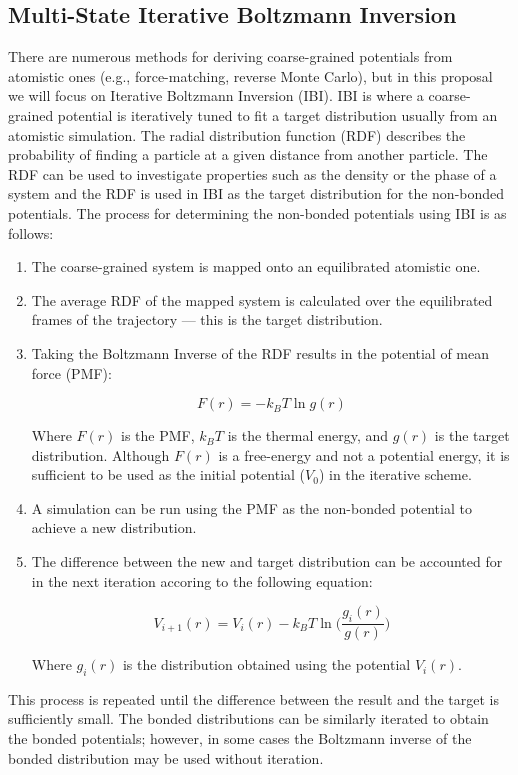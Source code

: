 \subsection*{Multi-State Iterative Boltzmann Inversion}

There are numerous methods for deriving coarse-grained potentials from atomistic ones (e.g., force-matching, reverse Monte Carlo), but in this proposal we will focus on Iterative Boltzmann Inversion (IBI).
IBI is where a coarse-grained potential is iteratively tuned to fit a target distribution usually from an atomistic simulation\cite{Reith2003}.
The radial distribution function (RDF) describes the probability of finding a particle at a given distance from another particle.
The RDF can be used to investigate properties such as the density or the phase of a system and the RDF is used in IBI as the target distribution for the non-bonded potentials. %
The process for determining the non-bonded potentials using IBI is as follows:
\begin{enumerate}
    \item 
        The coarse-grained system is mapped onto an equilibrated atomistic one.

    \item 
        The average RDF of the mapped system is calculated over the equilibrated frames of the trajectory --- this is the target distribution.

    \item 
        Taking the Boltzmann Inverse of the RDF results in the potential of mean force (PMF):
        
        \[
            F(r) = -k_{B}T \ln g(r)
        \]
        
        Where $F(r)$ is the PMF, $k_{B}T$ is the thermal energy, and $g(r)$ is the target distribution.
        Although $F(r)$ is a free-energy and not a potential energy, it is sufficient to be used as the initial potential ($V_{0}$) in the iterative scheme\cite{Reith2003}.

    \item
        A simulation can be run using the PMF as the non-bonded potential to achieve a new distribution.

    \item
        The difference between the new and target distribution can be accounted for in the next iteration accoring to the following equation:
        
        \[
            V_{i+1}(r) = V_{i}(r) - k_{B}T \ln\bigg(\frac{g_{i}(r)}{g(r)}\bigg)
        \]

        Where $g_{i}(r)$ is the distribution obtained using the potential $V_{i}(r)$.

\end{enumerate}
This process is repeated until the difference between the result and the target is sufficiently small. 
The bonded distributions can be similarly iterated to obtain the bonded potentials; however, in some cases the Boltzmann inverse of the bonded distribution may be used without iteration\cite{Reith2003}.

